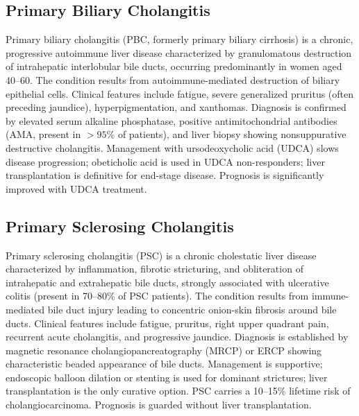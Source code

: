 \subsection{Primary Biliary Cholangitis}
\label{sec:Primary Biliary Cholangitis}
Primary biliary cholangitis (PBC, formerly primary biliary cirrhosis) is a chronic, progressive autoimmune liver disease characterized by granulomatous destruction of intrahepatic interlobular bile ducts, occurring predominantly in women aged 40--60. The condition results from autoimmune-mediated destruction of biliary epithelial cells. Clinical features include fatigue, severe generalized pruritus (often preceding jaundice), hyperpigmentation, and xanthomas. Diagnosis is confirmed by elevated serum alkaline phosphatase, positive antimitochondrial antibodies (AMA, present in $>95\%$ of patients), and liver biopsy showing nonsuppurative destructive cholangitis. Management with ursodeoxycholic acid (UDCA) slows disease progression; obeticholic acid is used in UDCA non-responders; liver transplantation is definitive for end-stage disease. Prognosis is significantly improved with UDCA treatment.

\subsection{Primary Sclerosing Cholangitis}
\label{sec:Primary Sclerosing Cholangitis}
Primary sclerosing cholangitis (PSC) is a chronic cholestatic liver disease characterized by inflammation, fibrotic stricturing, and obliteration of intrahepatic and extrahepatic bile ducts, strongly associated with ulcerative colitis (present in 70--80\% of PSC patients). The condition results from immune-mediated bile duct injury leading to concentric onion-skin fibrosis around bile ducts. Clinical features include fatigue, pruritus, right upper quadrant pain, recurrent acute cholangitis, and progressive jaundice. Diagnosis is established by magnetic resonance cholangiopancreatography (MRCP) or ERCP showing characteristic beaded appearance of bile ducts. Management is supportive; endoscopic balloon dilation or stenting is used for dominant strictures; liver transplantation is the only curative option. PSC carries a 10--15\% lifetime risk of cholangiocarcinoma. Prognosis is guarded without liver transplantation.

